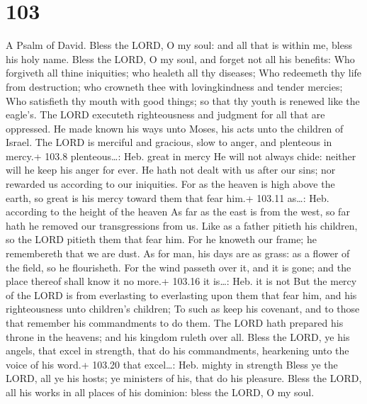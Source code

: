 \hypertarget{section-102}{%
\section{103}\label{section-102}}

A Psalm of David.  Bless the LORD, O my soul: and all that
is within me, bless his holy name.  Bless the LORD, O my
soul, and forget not all his benefits:  Who forgiveth all
thine iniquities; who healeth all thy diseases;  Who
redeemeth thy life from destruction; who crowneth thee with
lovingkindness and tender mercies;  Who satisfieth thy mouth
with good things; so that thy youth is renewed like the eagle's.
 The LORD executeth righteousness and judgment for all that
are oppressed.  He made known his ways unto Moses, his acts
unto the children of Israel.  The LORD is merciful and
gracious, slow to anger, and plenteous in mercy.+ 103.8 plenteous\ldots:
Heb. great in mercy  He will not always chide: neither will
he keep his anger for ever.  He hath not dealt with us
after our sins; nor rewarded us according to our iniquities.
 For as the heaven is high above the earth, so great is his
mercy toward them that fear him.+ 103.11 as\ldots: Heb. according to the
height of the heaven  As far as the east is from the west,
so far hath he removed our transgressions from us.  Like as
a father pitieth his children, so the LORD pitieth them that fear him.
 For he knoweth our frame; he remembereth that we are dust.
 As for man, his days are as grass: as a flower of the
field, so he flourisheth.  For the wind passeth over it,
and it is gone; and the place thereof shall know it no more.+ 103.16 it
is\ldots: Heb. it is not  But the mercy of the LORD is from
everlasting to everlasting upon them that fear him, and his
righteousness unto children's children;  To such as keep
his covenant, and to those that remember his commandments to do them.
 The LORD hath prepared his throne in the heavens; and his
kingdom ruleth over all.  Bless the LORD, ye his angels,
that excel in strength, that do his commandments, hearkening unto the
voice of his word.+ 103.20 that excel\ldots: Heb. mighty in strength
 Bless ye the LORD, all ye his hosts; ye ministers of his,
that do his pleasure.  Bless the LORD, all his works in all
places of his dominion: bless the LORD, O my soul.

